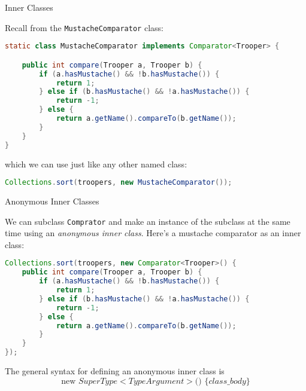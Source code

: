 \documentclass{beamer}
\begin{document}
\begin{frame}
  \titlepage
\end{frame}

\begin{frame}[fragile]{Inner Classes}

Recall from  the {\tt MustacheComparator} class:

\begin{lstlisting}[language=Java]
static class MustacheComparator implements Comparator<Trooper> {

    public int compare(Trooper a, Trooper b) {
        if (a.hasMustache() && !b.hasMustache()) {
            return 1;
        } else if (b.hasMustache() && !a.hasMustache()) {
            return -1;
        } else {
            return a.getName().compareTo(b.getName());
        }
    }
}
\end{lstlisting}

which we can use just like any other named class:

\begin{lstlisting}[language=Java]
Collections.sort(troopers, new MustacheComparator());
\end{lstlisting}


\end{frame}


\begin{frame}[fragile]{Anonymous Inner Classes}

We can subclass {\tt Comprator} and make an instance of the subclass at the same time using an {\it anonymous inner class}.  Here's a mustache comparator as an inner class:

\begin{lstlisting}[language=Java]
Collections.sort(troopers, new Comparator<Trooper>() {
    public int compare(Trooper a, Trooper b) {
        if (a.hasMustache() && !b.hasMustache()) {
            return 1;
        } else if (b.hasMustache() && !a.hasMustache()) {
            return -1;
        } else {
            return a.getName().compareTo(b.getName());
        }
    }
});
\end{lstlisting}

The general syntax for defining an anonymous inner class is
\[
\text{new } SuperType<TypeArgument>\text{() } \{ class\_body \}
\]

\end{frame}
\end{document}
